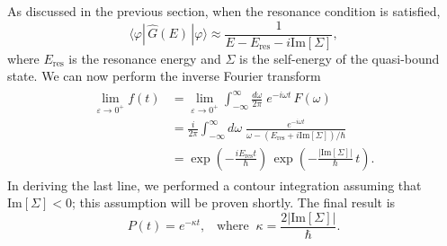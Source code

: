 \documentclass[pra,12pt]{revtex4}
\begin{document}
As discussed in the previous section, when the resonance condition is
satisfied,
\begin{equation}
  \langle\varphi|\,\hat{G}(E)\,|\varphi\rangle \approx \frac{1}{\displaystyle E - E_{\mathrm{res}} - i \mathrm{Im}[\Sigma]},
\end{equation}
where $E_{\mathrm{res}}$ is the resonance energy and $\Sigma$ is the
self-energy of the quasi-bound state.  We can now perform the
inverse Fourier transform
\begin{align}
  \begin{aligned} \lim_{\varepsilon\rightarrow 0^+} f(t) &= \lim_{\varepsilon\rightarrow 0^+} \int_{-\infty}^{\infty} \frac{d\omega}{2\pi} \; e^{-i\omega t} \, F(\omega) \\ &= \frac{i}{2\pi} \int_{-\infty}^{\infty} d\omega\; \frac{e^{-i\omega t}}{\omega - (E_{\mathrm{res}}+i \mathrm{Im}[\Sigma])/\hbar}\\ &= \exp\left(-\frac{iE_{\mathrm{res}}t}{\hbar}\right)\, \exp\left(-\frac{|\mathrm{Im}[\Sigma]|}{\hbar}\,t\right). \end{aligned}
\end{align}
In deriving the last line, we performed a contour integration assuming
that $\mathrm{Im}[\Sigma] < 0$; this assumption will be proven
shortly.  The final result is
\begin{equation}
  P(t) = e^{-\kappa t}, \;\;\;\mathrm{where}\;\;\kappa = \frac{2|\mathrm{Im}[\Sigma]|}{\hbar}.
\end{equation}
\end{document}
